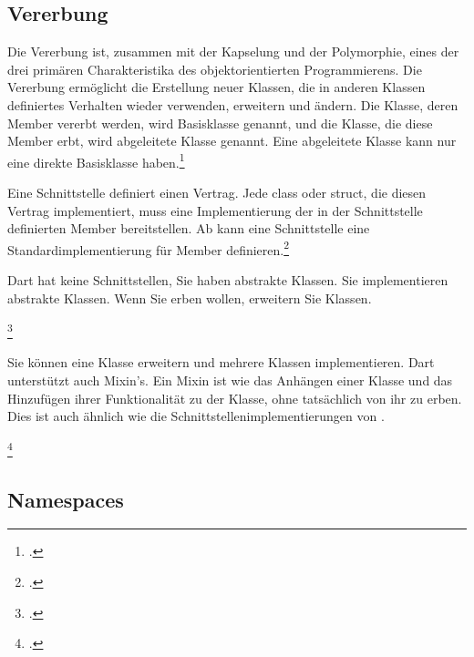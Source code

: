 \subsection{Vererbung}

Die Vererbung ist, zusammen mit der Kapselung und der Polymorphie, eines der drei primären Charakteristika des objektorientierten Programmierens. Die Vererbung ermöglicht die Erstellung neuer Klassen, die in anderen Klassen definiertes Verhalten wieder verwenden, erweitern und ändern. Die Klasse, deren Member vererbt werden, wird Basisklasse genannt, und die Klasse, die diese Member erbt, wird abgeleitete Klasse genannt. Eine abgeleitete Klasse kann nur eine direkte Basisklasse haben.\footcite[Vgl.  veerbung
][Abgerufen am \today]{GoogleFlutterSharedPreferences2020} 

Eine Schnittstelle definiert einen Vertrag. Jede class oder struct, die diesen Vertrag implementiert, muss eine Implementierung der in der Schnittstelle definierten Member bereitstellen. Ab  kann eine Schnittstelle eine Standardimplementierung für Member definieren.\footcite[Vgl. interface (\Csharp-Referenz)][Abgerufen am \today]{GoogleFlutterSharedPreferences2020} 

Dart hat keine Schnittstellen, Sie haben abstrakte Klassen. Sie implementieren abstrakte Klassen. Wenn Sie erben wollen, erweitern Sie Klassen.

\begin{minipage}{\linewidth}

\end{minipage}
\footcitetext[In Anlehnung an ][Abgerufen am \today]{Pedley2019}

Sie können eine Klasse erweitern und mehrere Klassen implementieren. Dart unterstützt auch Mixin's. Ein Mixin ist wie das Anhängen einer Klasse und das Hinzufügen ihrer Funktionalität zu der Klasse, ohne tatsächlich von ihr zu erben. Dies ist auch ähnlich wie die Schnittstellenimplementierungen von .

\begin{minipage}{\linewidth}

\end{minipage}
\footcitetext[In Anlehnung an ][Abgerufen am \today]{Pedley2019}

\subsection{Namespaces}

